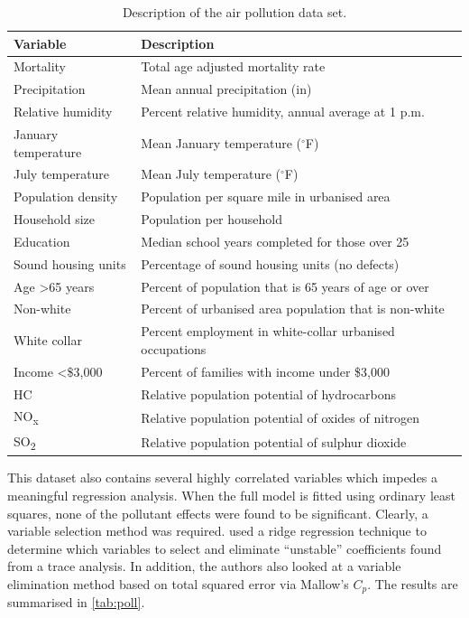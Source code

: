 \documentclass[11pt,twoside,openright]{report}
\begin{document}
\begin{table}[hbt]
\centering
\caption{Description of the air pollution data set.}
\label{tab:airpollution}
\begin{tabular}{ll}
\toprule
Variable                 & Description \\
\midrule
Mortality                & Total age adjusted mortality rate \\
Precipitation            & Mean annual precipitation (in) \\
Relative humidity        & Percent relative humidity, annual average at 1 p.m. \\
January temperature      & Mean January temperature ($^\circ$F) \\
July temperature         & Mean July temperature ($^\circ$F) \\
Population density       & Population per square mile in urbanised area \\
Household size & Population per household  \\
Education                & Median school years completed for those over 25 \\
Sound housing units      & Percentage of sound housing units (no defects) \\
Age >65 years            & Percent of population that is 65 years of age or over \\
Non-white                & Percent of urbanised area population that is non-white \\
White collar             & Percent employment in white-collar urbanised occupations \\
Income <\$3,000          & Percent of families with income under \$3,000 \\      
HC                       & Relative population potential of hydrocarbons \\     
NO\textsubscript{x}      & Relative population potential of oxides of nitrogen \\
SO\textsubscript{2}      & Relative population potential of sulphur dioxide \\       
\end{tabular}
\end{table}

This dataset also contains several highly correlated variables which impedes a meaningful regression analysis. 
When the full model is fitted using ordinary least squares, none of the pollutant effects were found to be significant. 
Clearly, a variable selection method was required. 
\citet{McDonald1973} used a ridge regression technique to determine which variables to select and eliminate ``unstable'' coefficients found from a trace analysis. 
In addition, the authors also looked at a variable elimination method based on total squared error via Mallow's $C_p$.
The results are summarised in \cref{tab:poll}.
\end{document}
